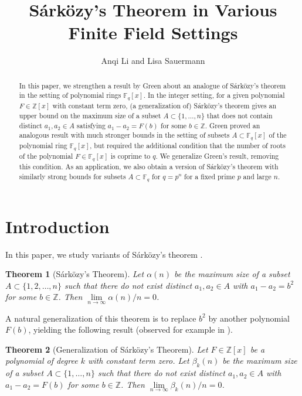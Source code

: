 \documentclass[11pt, reqno]{amsart}
\title{S\'ark\"ozy's Theorem in Various Finite Field Settings}
\author{Anqi Li and Lisa Sauermann}\thanks{Li was supported by Mariana Polonsky Slocum (1955) Memorial Fund as part of the MIT Undergraduate Research Opportunities Program (UROP). Sauermann was supported by NSF Award DMS-2100157 and a Sloan Research Fellowship.}
\newtheorem{theorem}{Theorem}[section]
\theoremstyle{definition}
\newcommand{\Z}{\mathbb{Z}}
\begin{document}
\maketitle
\begin{abstract}
    In this paper, we strengthen a result by Green about an analogue of S\'ark\"ozy's theorem in the setting of polynomial rings $\mathbb{F}_q[x]$. In the integer setting, for a given polynomial $F \in \mathbb{Z}[x]$ with constant term zero, (a generalization of) S\'ark\"ozy's theorem gives an upper bound on the maximum size of a subset $A \subset \{1, \ldots, n \}$ that does not contain distinct $a_1,a_2 \in A$ satisfying $a_1 - a_2 = F(b)$ for some $ b \in \mathbb{Z}$. Green proved an analogous result with much stronger bounds in the setting of subsets $A \subset \mathbb{F}_q[x]$ of the polynomial ring $\mathbb{F}_q[x]$, but required the additional condition that the number of roots of the polynomial $F \in \mathbb{F}_q[x]$ is coprime to $q$. We generalize Green’s result, removing this condition. As an application, we also obtain a version of S\'ark\"ozy’s theorem with similarly strong bounds for subsets $A \subset \mathbb{F}_q$ for $q = p^n$ for a fixed prime $p$ and large $n$. 
\end{abstract}


\section{Introduction}

In this paper, we study variants of S\'ark\"ozy's theorem \cite{S78}.

\begin{theorem}[S\'ark\"ozy's Theorem]\label{thm:Sarkozy}
Let $\alpha(n)$ be the maximum size of a subset $A \subset \{1, 2, \ldots, n\}$ such that there do not exist distinct $a_1, a_2 \in A$ with $a_1 - a_2 = b^2$ for some $b \in \mathbb{Z}$. Then $\lim \limits_{n \rightarrow \infty} \alpha(n)/n = 0$.
\end{theorem}

A natural generalization of this theorem is to replace $b^2$ by another polynomial $F(b)$, yielding the following result (observed for example in \cite{KM78}). 

\begin{theorem}[Generalization of S\'ark\"ozy's Theorem]\label{thm:Sarkozy2}
Let $F \in \Z[x]$ be a polynomial of degree $k$ with constant term zero. Let $\beta_{k}(n)$ be the maximum size of a subset $A \subset \{1, \ldots, n \}$ such that there do not exist distinct $a_1, a_2 \in A$ with $a_1 - a_2 = F(b)$ for some $b \in \Z$. Then $\lim \limits_{n \rightarrow \infty} \beta_k(n)/n = 0$.
\end{theorem}
\end{document}
